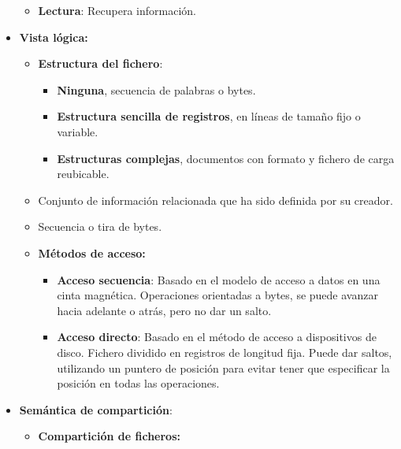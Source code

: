 \documentclass[12pt, twoside, openright]{report} %
\begin{document}
\begin{itemize}
\begin{itemize}
    \item \textbf{Lectura}: Recupera información.
      
    \end{itemize}
	\pagebreak
  \item \textbf{Vista lógica:}
    

    \begin{itemize}
    \item \textbf{Estructura del fichero}:
      

      \begin{itemize}
      \item \textbf{Ninguna}, secuencia de palabras o bytes.
        
      \item \textbf{Estructura sencilla de registros}, en líneas de tamaño
        fijo o variable.
        
      \item \textbf{Estructuras complejas}, documentos con formato y fichero
        de carga reubicable.
        
      \end{itemize}
    \item Conjunto de información relacionada que ha sido definida por su
      creador.
      
    \item Secuencia o tira de bytes.
      
    \item \textbf{Métodos de acceso:}
      

      \begin{itemize}
      \item \textbf{Acceso secuencia}: Basado en el modelo de acceso a datos
        en una cinta magnética. Operaciones orientadas a bytes, se puede
        avanzar hacia adelante o atrás, pero no dar un salto.
        
      \item \textbf{Acceso directo}: Basado en el método de acceso a
        dispositivos de disco. Fichero dividido en registros de longitud
        fija. Puede dar saltos, utilizando un puntero de posición para
        evitar tener que especificar la posición en todas las
        operaciones.
        
      \end{itemize}
    \end{itemize}
  \item \textbf{Semántica de compartición}:
    

    \begin{itemize}
    \item \textbf{Compartición de ficheros:}
      


\end{itemize}
\end{itemize}
\end{document}

